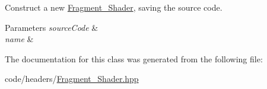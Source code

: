 Construct a new \mbox{\hyperlink{classprz_1_1_fragment___shader}{Fragment\+\_\+\+Shader}}, saving the source code. 


\begin{DoxyParams}{Parameters}
{\em source\+Code} & \\
\hline
{\em name} & \\
\hline
\end{DoxyParams}


The documentation for this class was generated from the following file\+:\begin{DoxyCompactItemize}
\item 
code/headers/\mbox{\hyperlink{_fragment___shader_8hpp}{Fragment\+\_\+\+Shader.\+hpp}}\end{DoxyCompactItemize}
